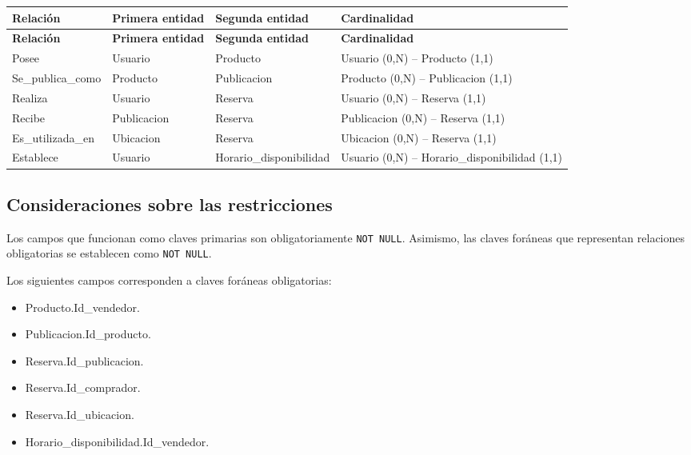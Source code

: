 \documentclass[12pt]{article} %
\begin{document}
\begin{longtable}{>{\raggedright\arraybackslash}p{3.5cm}
                  >{\raggedright\arraybackslash}p{3.5cm}
                  >{\raggedright\arraybackslash}p{4.0cm}
                  >{\raggedright\arraybackslash}p{4.0cm}}
\toprule
\textbf{Relación} &
\textbf{Primera entidad} &
\textbf{Segunda entidad} &
\textbf{Cardinalidad} \\
\midrule
\endfirsthead

\toprule
\textbf{Relación} &
\textbf{Primera entidad} &
\textbf{Segunda entidad} &
\textbf{Cardinalidad} \\
\midrule
\endhead

Posee &
Usuario &
Producto &
Usuario (0,N) -- Producto (1,1) \\

Se\_publica\_como &
Producto &
Publicacion &
Producto (0,N) -- Publicacion (1,1) \\

Realiza &
Usuario &
Reserva &
Usuario (0,N) -- Reserva (1,1) \\

Recibe &
Publicacion &
Reserva &
Publicacion (0,N) -- Reserva (1,1) \\

Es\_utilizada\_en &
Ubicacion &
Reserva &
Ubicacion (0,N) -- Reserva (1,1) \\

Establece &
Usuario &
Horario\_disponibilidad &
Usuario (0,N) -- Horario\_disponibilidad (1,1) \\

\bottomrule
\end{longtable}

\subsection{Consideraciones sobre las restricciones}

Los campos que funcionan como claves primarias son obligatoriamente
\texttt{NOT NULL}. Asimismo, las claves foráneas que representan
relaciones obligatorias se establecen como \texttt{NOT NULL}.

Los siguientes campos corresponden a claves foráneas obligatorias:

\begin{itemize}
    \item Producto.Id\_vendedor.
    \item Publicacion.Id\_producto.
    \item Reserva.Id\_publicacion.
    \item Reserva.Id\_comprador.
    \item Reserva.Id\_ubicacion.
    \item Horario\_disponibilidad.Id\_vendedor.
\end{itemize}
\end{document}
